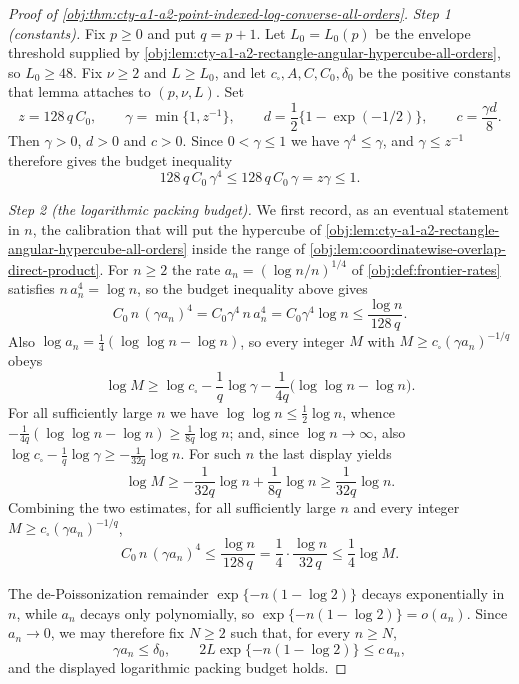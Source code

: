 \begin{proof}[Proof of \cref{obj:thm:cty-a1-a2-point-indexed-log-converse-all-orders}]
\emph{Step 1 (constants).}
Fix \(p\geq 0\) and put \(q=p+1\).  Let \(L_0=L_0(p)\) be the envelope threshold
supplied by \cref{obj:lem:cty-a1-a2-rectangle-angular-hypercube-all-orders}, so
\(L_0\geq 48\).  Fix \(\nu\geq 2\) and \(L\geq L_0\), and let
\(c_\square,A,C,C_0,\delta_0\) be the positive constants that lemma attaches to
\((p,\nu,L)\).  Set
\[
z=128\,q\,C_0,\qquad
\gamma=\min\{1,z^{-1}\},\qquad
d=\frac12\bigl\{1-\exp(-1/2)\bigr\},\qquad
c=\frac{\gamma d}{8}.
\]
Then \(\gamma>0\), \(d>0\) and \(c>0\).  Since \(0<\gamma\leq 1\) we have
\(\gamma^4\leq\gamma\), and \(\gamma\leq z^{-1}\) therefore gives the budget
inequality
\[
128\,q\,C_0\,\gamma^4\leq 128\,q\,C_0\,\gamma= z\gamma\leq 1 .
\]

\emph{Step 2 (the logarithmic packing budget).}
We first record, as an eventual statement in \(n\), the calibration that will
put the hypercube of \cref{obj:lem:cty-a1-a2-rectangle-angular-hypercube-all-orders}
inside the range of \cref{obj:lem:coordinatewise-overlap-direct-product}.  For
\(n\geq2\) the rate \(a_n=(\log n/n)^{1/4}\) of \cref{obj:def:frontier-rates}
satisfies \(n\,a_n^4=\log n\), so the budget inequality above gives
\[
C_0\,n\,(\gamma a_n)^4
=C_0\gamma^4\,n\,a_n^4
=C_0\gamma^4\log n
\leq\frac{\log n}{128\,q}.
\]
Also \(\log a_n=\frac14(\log\log n-\log n)\), so every integer \(M\) with
\(M\geq c_\square(\gamma a_n)^{-1/q}\) obeys
\[
\log M
\geq
\log c_\square-\frac1q\log\gamma
-\frac1{4q}\bigl(\log\log n-\log n\bigr).
\]
For all sufficiently large \(n\) we have \(\log\log n\leq\frac12\log n\), whence
\(-\frac1{4q}(\log\log n-\log n)\geq\frac1{8q}\log n\); and, since
\(\log n\to\infty\), also
\(\log c_\square-\frac1q\log\gamma\geq-\frac1{32q}\log n\).  For such \(n\) the
last display yields
\[
\log M\geq-\frac1{32q}\log n+\frac1{8q}\log n\geq\frac1{32q}\log n .
\]
Combining the two estimates, for all sufficiently large \(n\) and every integer
\(M\geq c_\square(\gamma a_n)^{-1/q}\),
\[
C_0\,n\,(\gamma a_n)^4
\leq\frac{\log n}{128\,q}
=\frac14\cdot\frac{\log n}{32\,q}
\leq\frac14\log M .
\]

The de-Poissonization remainder \(\exp\{-n(1-\log2)\}\) decays exponentially in
\(n\), while \(a_n\) decays only polynomially, so
\(\exp\{-n(1-\log 2)\}=o(a_n)\).
Since \(a_n\to0\), we may therefore fix \(N\geq2\) such that, for every \(n\geq N\),
\[
\gamma a_n\leq\delta_0,
\qquad
2L\exp\{-n(1-\log 2)\}\leq c\,a_n,
\]
and the displayed logarithmic packing budget holds.


\end{proof}
